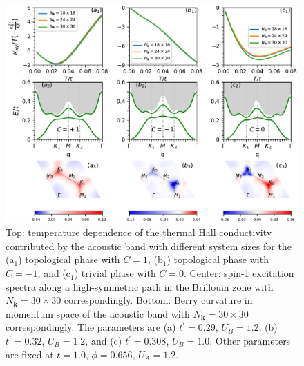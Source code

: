 \documentclass[amsmath,superscriptaddress,showpacs,aps,prl,onecolumn,notitlepage]{revtex4-1}
\begin{document}
\begin{figure}
\centering
\includegraphics[width=1.0\textwidth]{ThermalHallWithTemperature}
\caption{Top: temperature dependence of the thermal Hall conductivity contributed by the acoustic band with different system sizes for the (a$_1$) topological phase with $C=1$, (b$_1$) topological phase with $C=-1$, and (c$_1$) trivial phase with $C=0$. Center: spin-1 excitation spectra along a high-symmetric path in the Brillouin zone with $N_\mathbf{k}=30\times30$ correspondingly. Bottom: Berry curvature in momentum space of the acoustic band with $N_\mathbf{k}=30\times30$ correspondingly. The parameters are (a) $t^\prime=0.29$, $U_B=1.2$, (b) $t^\prime=0.32$, $U_B=1.2$, and (c) $t^\prime=0.308$, $U_B=1.0$. Other parameters are fixed at $t=1.0$, $\phi=0.656$, $U_A=1.2$.}
\label{THWT}
\end{figure}
\end{document}
